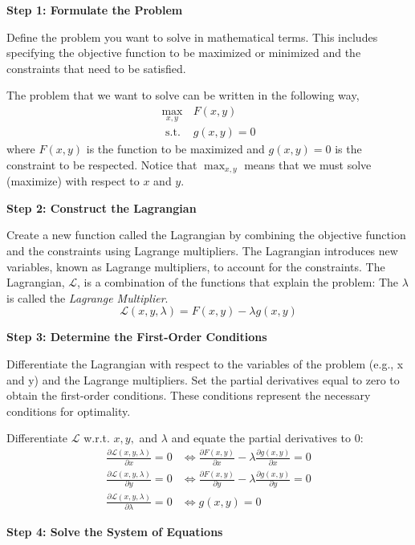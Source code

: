 \documentclass[
  12pt,
  oneside]{book}
\theoremstyle{definition}
\theoremstyle{definition}
\theoremstyle{definition}
\theoremstyle{definition}
\theoremstyle{remark}
\begin{document}
\textbf{Step 1: Formulate the Problem}

Define the problem you want to solve in mathematical terms.
This includes specifying the objective function to be maximized or minimized and
the constraints that need to be satisfied.

The problem that we want to solve can be written in the following way,
\[
\begin{array}{ll}
    \max _{x, y} & F(x, y) \\
    \text { s.t. } & g(x, y)=0
\end{array}
\]
where \(F(x, y)\) is the function to be maximized and \(g(x, y)=0\) is the constraint to be respected.
Notice that \(\max _{x, y}\) means that we must solve (maximize) with respect to \(x\) and \(y\).

\textbf{Step 2: Construct the Lagrangian}

Create a new function called the Lagrangian by combining the objective function
and the constraints using Lagrange multipliers. The Lagrangian introduces new variables,
known as Lagrange multipliers, to account for the constraints.
The Lagrangian, \(\mathcal{L}\), is a combination of the functions that explain the problem:
The \(\lambda\) is called the \textit{Lagrange Multiplier}.
\[
\mathcal{L}(x, y, \lambda)=F(x, y)-\lambda g(x, y)
\]

\textbf{Step 3: Determine the First-Order Conditions}

Differentiate the Lagrangian with respect to the variables of the problem (e.g., x and y)
and the Lagrange multipliers. Set the partial derivatives equal to zero to obtain
the first-order conditions. These conditions represent the necessary conditions for optimality.

Differentiate \(\mathcal{L}\) w.r.t. \(x, y,\) and \(\lambda\) and equate the partial derivatives to 0:
\begin{align*}
    \frac{\partial \mathcal{L}(x, y, \lambda)}{\partial x}=0 & \Leftrightarrow \frac{\partial F(x, y)}{\partial x}-\lambda \frac{\partial g(x, y)}{\partial x}=0 \\
    \frac{\partial \mathcal{L}(x, y, \lambda)}{\partial y}=0 & \Leftrightarrow \frac{\partial F(x, y)}{\partial y}-\lambda \frac{\partial g(x, y)}{\partial y}=0 \\
    \frac{\partial \mathcal{L}(x, y, \lambda)}{\partial \lambda}=0 & \Leftrightarrow g(x, y)=0
\end{align*}

\textbf{Step 4: Solve the System of Equations}
\end{document}
